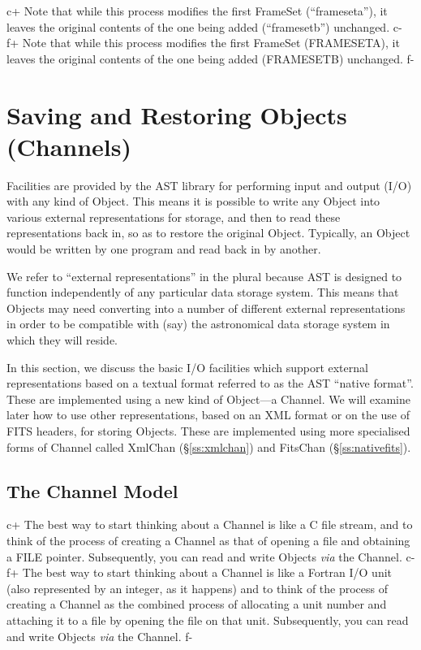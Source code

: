 \documentclass[twoside,11pt]{article}
\newcommand{\secref}[1]{\S\ref{#1}}
\newcommand{\secref}[1]{\ref{#1}}
\begin{document}
c+
Note that while this process modifies the first FrameSet
(``frameseta''), it leaves the original contents of the one being
added (``framesetb'') unchanged.
c-
f+
Note that while this process modifies the first FrameSet (FRAMESETA),
it leaves the original contents of the one being added (FRAMESETB)
unchanged.
f-


\cleardoublepage
\section{\label{ss:channels}Saving and Restoring Objects (Channels)}

Facilities are provided by the AST library for performing input and
output (I/O) with any kind of Object. This means it is possible
to write any Object into various external representations for
storage, and then to read these representations back in, so as to
restore the original Object. Typically, an Object would be written by
one program and read back in by another.

We refer to ``external representations'' in the plural because AST is
designed to function independently of any particular data storage
system. This means that Objects may need converting into a number of
different external representations in order to be compatible with
(say) the astronomical data storage system in which they will reside.

In this section, we discuss the basic I/O facilities which support
external representations based on a textual format referred to as the AST
``native format''. These are implemented using a new kind of Object---a
Channel. We will examine later how to use other representations, based on
an XML format or on the use of FITS headers, for storing Objects. These
are implemented using more specialised forms of Channel called XmlChan
(\secref{ss:xmlchan}) and FitsChan (\secref{ss:nativefits}).

\subsection{The Channel Model}

c+
The best way to start thinking about a Channel is like a C file
stream, and to think of the process of creating a Channel as that
of opening a file and obtaining a FILE pointer.  Subsequently, you can
read and write Objects {\em{via}} the Channel.
c-
f+
The best way to start thinking about a Channel is like a Fortran I/O
unit (also represented by an integer, as it happens) and to think of
the process of creating a Channel as the combined process of
allocating a unit number and attaching it to a file by opening the
file on that unit. Subsequently, you can read and write Objects
{\em{via}} the Channel.
f-
\end{document}
